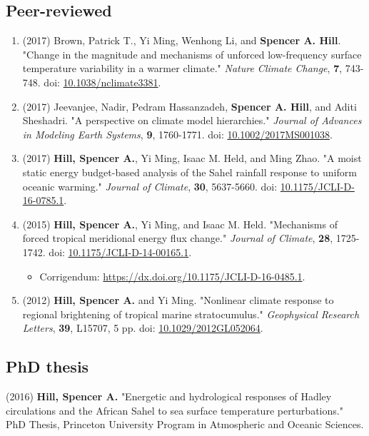\documentclass[12pt,letterpaper]{shillcv}
\begin{document}
\subsection*{Peer-reviewed}
\label{sec:org4e88e44}
\begin{enumerate}
\item (2017) Brown, Patrick T., Yi Ming, Wenhong Li, and \textbf{Spencer A. Hill}.  "Change
in the magnitude and mechanisms of unforced low-frequency surface temperature
variability in a warmer climate."  \emph{Nature Climate Change}, \textbf{7}, 743-748.
doi: \href{https://doi.org/10.1038/nclimate3381}{10.1038/nclimate3381}.
\item (2017) Jeevanjee, Nadir, Pedram Hassanzadeh, \textbf{Spencer A. Hill}, and Aditi
Sheshadri.  "A perspective on climate model hierarchies."  \emph{Journal
of Advances in Modeling Earth Systems}, \textbf{9}, 1760-1771.  doi: \href{https://doi.org/10.1002/2017MS001038}{10.1002/2017MS001038}.
\item (2017) \textbf{Hill, Spencer A.}, Yi Ming, Isaac M. Held, and Ming Zhao.  "A moist
static energy budget-based analysis of the Sahel rainfall response to uniform
oceanic warming."  \emph{Journal of Climate}, \textbf{30}, 5637-5660.  doi:
\href{https://doi.org/10.1175/JCLI-D-16-0785.1}{10.1175/JCLI-D-16-0785.1}.
\item (2015) \textbf{Hill, Spencer A.}, Yi Ming, and Isaac M. Held.  "Mechanisms of forced
tropical meridional energy flux change."  \emph{Journal of Climate}, \textbf{28}, 1725-1742.
doi: \href{http://dx.doi.org/10.1175/JCLI-D-14-00165.1}{10.1175/JCLI-D-14-00165.1}.
\begin{itemize}
\item Corrigendum: \url{https://dx.doi.org/10.1175/JCLI-D-16-0485.1}.
\end{itemize}
\item (2012) \textbf{Hill, Spencer A.} and Yi Ming.  "Nonlinear climate response to regional
brightening of tropical marine stratocumulus."  \emph{Geophysical Research Letters},
\textbf{39}, L15707, 5 pp. doi:
\href{http://dx.doi.org/10.1029/2012GL052064}{10.1029/2012GL052064}.
\end{enumerate}
\subsection*{PhD thesis}
\label{sec:org20fbc18}
(2016) \textbf{Hill, Spencer A.} "Energetic and hydrological responses of Hadley
circulations and the African Sahel to sea surface temperature perturbations."
PhD Thesis, Princeton University Program in Atmospheric and Oceanic Sciences.
\end{document}
